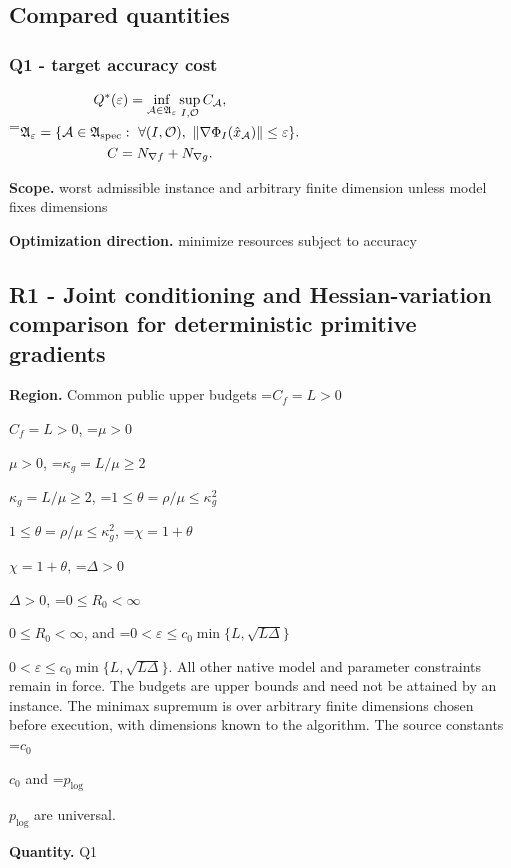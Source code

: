 \documentclass[10pt,a4paper]{article}
\newcommand{\AtlasMath}[1]{\par\begingroup\centering\setbox0=\hbox{$\displaystyle #1$}\ifdim\wd0>1.4\linewidth\typeout{ATLAS WIDE FORMULA: \the\wd0}\fi\ifdim\wd0>\linewidth\resizebox{\linewidth}{!}{\box0}\else\box0\fi\par\endgroup}
\newcommand{\AtlasInlineMath}[1]{\begingroup\setbox0=\hbox{$#1$}\ifdim\wd0>.4\linewidth\endgroup\AtlasMath{#1}\else\endgroup$#1$\fi}
\begin{document}
\subsection{Compared quantities}


\subsubsection{Q1 - target accuracy cost}


\AtlasMath{\begin{gathered}Q^*(\varepsilon)=\inf_{\mathcal A\in\mathfrak A_\varepsilon}\sup_{I,\mathcal O}C_{\mathcal A},\\\mathfrak A_\varepsilon=\{\mathcal A\in\mathfrak A_{\rm spec}:\ \forall(I,\mathcal O),\ \|\nabla\Phi_I(\hat x_{\mathcal A})\|\le\varepsilon\}.\\C=N_{\nabla f}+N_{\nabla g}.\end{gathered}}


\textbf{Scope.} worst admissible instance and arbitrary finite dimension unless model fixes dimensions



\textbf{Optimization direction.} minimize resources subject to accuracy



\subsection{R1 - Joint conditioning and Hessian-variation comparison for deterministic primitive gradients}


\textbf{Region.} Common public upper budgets \AtlasInlineMath{C_f=L>0}, \AtlasInlineMath{\mu>0}, \AtlasInlineMath{\kappa_g=L/\mu\ge2}, \AtlasInlineMath{1\le\theta=\rho/\mu\le\kappa_g^2}, \AtlasInlineMath{\chi=1+\theta}, \AtlasInlineMath{\Delta>0}, \AtlasInlineMath{0\le R_0<\infty}, and \AtlasInlineMath{0<\varepsilon\le c_0\min\{L,\sqrt{L\Delta}\}}. All other native model and parameter constraints remain in force. The budgets are upper bounds and need not be attained by an instance. The minimax supremum is over arbitrary finite dimensions chosen before execution, with dimensions known to the algorithm. The source constants \AtlasInlineMath{c_0} and \AtlasInlineMath{p_{\log}} are universal.



\textbf{Quantity.} Q1
\end{document}
